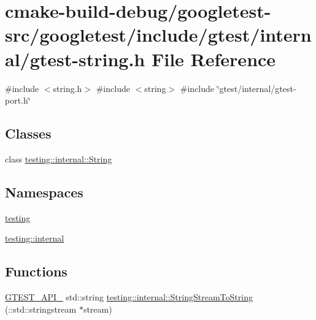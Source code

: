 \hypertarget{gtest-string_8h}{}\section{cmake-\/build-\/debug/googletest-\/src/googletest/include/gtest/internal/gtest-\/string.h File Reference}
\label{gtest-string_8h}
{\ttfamily \#include $<$string.\+h$>$}\newline
{\ttfamily \#include $<$string$>$}\newline
{\ttfamily \#include \char`\"{}gtest/internal/gtest-\/port.\+h\char`\"{}}\newline
\subsection*{Classes}
\begin{DoxyCompactItemize}
\item 
class \mbox{\hyperlink{classtesting_1_1internal_1_1String}{testing\+::internal\+::\+String}}
\end{DoxyCompactItemize}
\subsection*{Namespaces}
\begin{DoxyCompactItemize}
\item 
 \mbox{\hyperlink{namespacetesting}{testing}}
\item 
 \mbox{\hyperlink{namespacetesting_1_1internal}{testing\+::internal}}
\end{DoxyCompactItemize}
\subsection*{Functions}
\begin{DoxyCompactItemize}
\item 
\mbox{\hyperlink{gtest-port_8h_aa73be6f0ba4a7456180a94904ce17790}{G\+T\+E\+S\+T\+\_\+\+A\+P\+I\+\_\+}} std\+::string \mbox{\hyperlink{namespacetesting_1_1internal_ac0a2b7f69fc829d80a39e925b6417e39}{testing\+::internal\+::\+String\+Stream\+To\+String}} (\+::std\+::stringstream $\ast$stream)
\end{DoxyCompactItemize}
